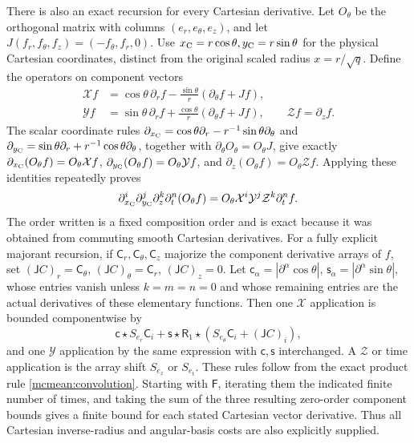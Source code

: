 There is also an exact recursion for every Cartesian derivative.
Let \(O_\theta\) be the orthogonal matrix with columns
\((e_r,e_\theta,e_z)\), and let
\(J(f_r,f_\theta,f_z)=(-f_\theta,f_r,0)\). Use
\(x_{\rm C}=r\cos\theta,y_{\rm C}=r\sin\theta\) for the physical
Cartesian coordinates, distinct from the original scaled radius
\(x=r/\sqrt q\). Define the operators on component vectors
\begin{equation}\label{mcmean:cartesian_recursion}
\begin{split}
 \mathcal Xf&=\cos\theta\,\partial_rf
        -\frac{\sin\theta}{r}(\partial_\theta f+Jf),\\
 \mathcal Yf&=\sin\theta\,\partial_rf
        +\frac{\cos\theta}{r}(\partial_\theta f+Jf),
 \qquad \mathcal Zf=\partial_zf.
\end{split}
\end{equation}
The scalar coordinate rules
\(\partial_{x_{\rm C}}=\cos\theta\partial_r
-r^{-1}\sin\theta\partial_\theta\) and
\(\partial_{y_{\rm C}}=\sin\theta\partial_r
+r^{-1}\cos\theta\partial_\theta\), together with
\(\partial_\theta O_\theta=O_\theta J\), give exactly
\(\partial_{x_{\rm C}}(O_\theta f)=O_\theta\mathcal Xf\),
\(\partial_{y_{\rm C}}(O_\theta f)=O_\theta\mathcal Yf\), and
\(\partial_z(O_\theta f)=O_\theta\mathcal Zf\).
Applying these identities repeatedly proves
\[
 \partial_{x_{\rm C}}^i\partial_{y_{\rm C}}^j
 \partial_z^k\partial_t^n(O_\theta f)
   =O_\theta\mathcal X^i\mathcal Y^j\mathcal Z^k\partial_t^nf.
\]
The order written is a fixed composition order and is exact because
it was obtained from commuting smooth Cartesian derivatives.
For a fully explicit majorant recursion, if \(\mathsf C_r,
\mathsf C_\theta,\mathsf C_z\) majorize the component derivative
arrays of \(f\), set \((\mathsf J C)_r=\mathsf C_\theta\),
\((\mathsf J C)_\theta=\mathsf C_r\),
\((\mathsf J C)_z=0\). Let \(\mathsf c_\alpha
=|\partial^\alpha\cos\theta|\),
\(\mathsf s_\alpha=|\partial^\alpha\sin\theta|\), whose entries
vanish unless \(k=m=n=0\) and whose remaining entries are the
actual derivatives of these elementary functions. Then one
\(\mathcal X\) application is bounded componentwise by
\[
 \mathsf c\star S_{e_r}\mathsf C_i
 +\mathsf s\star\mathsf R_1\star
             (S_{e_\theta}\mathsf C_i+(\mathsf J C)_i),
\]
and one \(\mathcal Y\) application by the same expression with
\(\mathsf c,\mathsf s\) interchanged. A \(\mathcal Z\) or time
application is the array shift \(S_{e_z}\) or \(S_{e_t}\).
These rules follow from the exact product rule
\eqref{mcmean:convolution}. Starting with \(\mathsf F\), iterating
them the indicated finite number of times, and taking the sum of
the three resulting zero-order component bounds gives a finite bound
for each stated Cartesian vector derivative. Thus all Cartesian
inverse-radius and angular-basis costs are also explicitly supplied.

